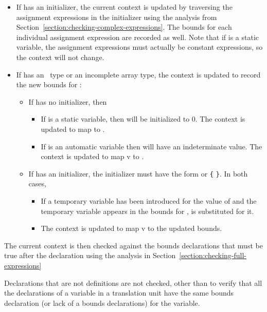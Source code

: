 \begin{itemize}
\item
  If  has an initializer, the current context is updated by
  traversing the assignment expressions in the initializer using the
  analysis from Section~\ref{section:checking-complex-expressions}.
  The bounds for each individual assignment
  expression are recorded as well. Note that if  is a static
  variable, the assignment expressions must actually be constant
  expressions, so the context will not change.
\item
  If  has an \arrayptr\ type or an incomplete array
  type, the context is updated to record the new bounds for :

  \begin{itemize}
  \item
    If  has no initializer, then

    \begin{itemize}
    \item
      If  is a static variable, then  will be
      initialized to 0. The context is updated to map  to
      \boundsany.
    \item
      If  is an automatic variable then  will have an
      indeterminate value. The context is updated to map v to
      \boundsunknown.
    \end{itemize}
  \item
    If  has an initializer, the initializer must have the form
     or \lstinline|{|  \lstinline|}|. In both cases,

    \begin{itemize}
    \item
      If a temporary variable has been introduced for the value 
      of  and the temporary variable appears in the bounds for
      ,  is substituted for it.
    \item
      The context is updated to map v to the updated bounds.
    \end{itemize}
  \end{itemize}
\end{itemize}

The current context is then checked against the bounds declarations that
must be true after the declaration using the analysis in 
Section~\ref{section:checking-full-expressions}

Declarations that are not definitions are not checked, other than to
verify that all the declarations of a variable in a translation unit
have the same bounds declaration (or lack of a bounds declarations) for
the variable.

